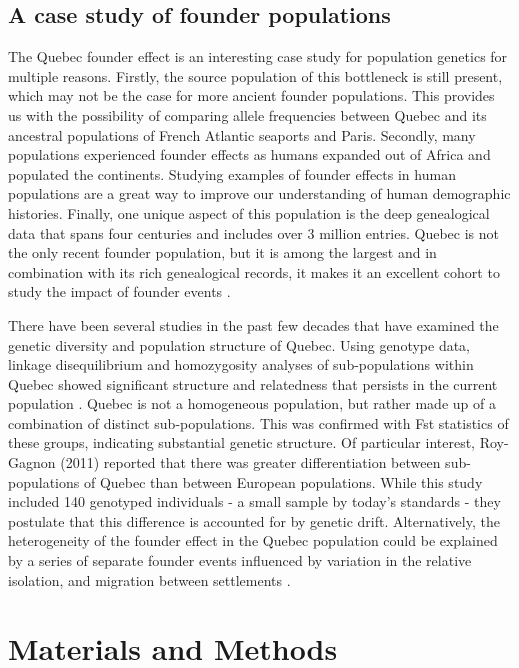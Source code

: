\documentclass[
11pt, %
oneside, %
english, %
doublespacing, %
headsepline, %
chapterinoneline, %
]{MastersDoctoralThesis} %
\begin{document}
\subsection{A case study of founder populations}

The Quebec founder effect is an interesting case study for population genetics for multiple reasons.
Firstly, the source population of this bottleneck is still present, which may not be the case for more ancient founder populations. 
This provides us with the possibility of comparing allele frequencies between Quebec and its ancestral populations of French Atlantic seaports and Paris.
Secondly, many populations experienced founder effects as humans expanded out of Africa and populated the continents.
Studying examples of founder effects in human populations are a great way to improve our understanding of human demographic histories.
Finally, one unique aspect of this population is the deep genealogical data that spans four centuries and includes over 3 million entries.
Quebec is not the only recent founder population, but it is among the largest and in combination with its rich genealogical records, it makes it an excellent cohort to study the impact of founder events \citep{Larmuseau2013}.

There have been several studies in the past few decades that have examined the genetic diversity and population structure of Quebec.
Using genotype data, linkage disequilibrium and homozygosity analyses of sub-populations within Quebec showed significant structure and relatedness that persists in the current population \citep{Bherer2010,Gagnon2011,Roy-Gagnon2011}.
Quebec is not a homogeneous population, but rather made up of a combination of distinct sub-populations.
This was confirmed with Fst statistics of these groups, indicating substantial genetic structure.
Of particular interest, Roy-Gagnon (2011) reported that there was greater differentiation between sub-populations of Quebec than between European populations.
While this study included 140 genotyped individuals - a small sample by today's standards - they postulate that this difference is accounted for by genetic drift.
Alternatively, the heterogeneity of the founder effect in the Quebec population could be explained by a series of separate founder events influenced by variation in the relative isolation, and migration between settlements \citep{Gagnon2001,Laberge2005}.

\section{Materials and Methods}
\end{document}
